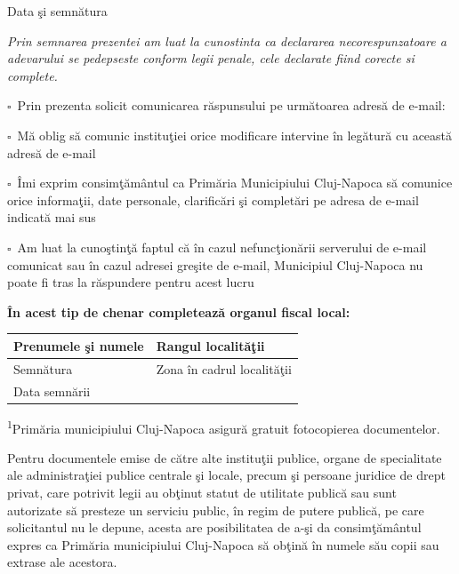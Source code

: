 \documentclass[8pt,a4paper,landscape]{extarticle}
\newcommand{\fillline}[1][6cm]{\underline{\hspace{#1}}}
\newcommand{\checkboxempty}{$\square$}
\begin{document}
\vspace{0.15cm}

Data şi semnătura \fillline[8cm]

\vspace{0.5cm}

\textit{Prin semnarea prezentei am luat la cunostinta ca declararea necorespunzatoare a adevarului se pedepseste conform legii penale, cele declarate fiind corecte si complete.}

\vspace{0.5cm}

\checkboxempty\ Prin prezenta solicit comunicarea răspunsului pe următoarea adresă de e-mail: \fillline[10cm]

\checkboxempty\ Mă oblig să comunic instituţiei orice modificare intervine în legătură cu această adresă de e-mail

\checkboxempty\ Îmi exprim consimţământul ca Primăria Municipiului Cluj-Napoca să comunice orice informaţii, date personale, clarificări şi completări pe adresa de e-mail indicată mai sus

\checkboxempty\ Am luat la cunoştinţă faptul că în cazul nefuncţionării serverului de e-mail comunicat sau în cazul adresei greşite de e-mail, Municipiul Cluj-Napoca nu poate fi tras la răspundere pentru acest lucru

\vspace{0.5cm}

\textbf{În acest tip de chenar completează organul fiscal local:}

\begin{tabularx}{\textwidth}{|X|X|}
\hline
Prenumele şi numele \fillline[6cm] & Rangul localităţii \fillline[4cm] \\
\hline
Semnătura \fillline[6cm] & Zona în cadrul localităţii \fillline[4cm] \\
\hline
Data semnării \fillline[4cm] & \\
\hline
\end{tabularx}

\vspace{0.5cm}

\footnotesize
\textsuperscript{1}Primăria municipiului Cluj-Napoca asigură gratuit fotocopierea documentelor.

Pentru documentele emise de către alte instituţii publice, organe de specialitate ale administraţiei publice centrale şi locale, precum şi persoane juridice de drept privat, care potrivit legii au obţinut statut de utilitate publică sau sunt autorizate să presteze un serviciu public, în regim de putere publică, pe care solicitantul nu le depune, acesta are posibilitatea de a-şi da consimţământul expres ca Primăria municipiului Cluj-Napoca să obţină în numele său copii sau extrase ale acestora.
\end{document}
